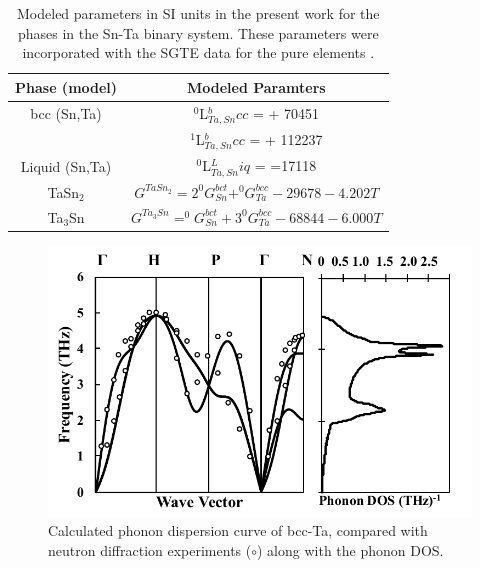 \newpage
\begin{table}[H]
 	\caption{Modeled parameters in SI units in the present work for the phases in the Sn-Ta binary system. These parameters were incorporated with the SGTE data for the pure elements \cite{Dinsdale1991}.}
 	\centering
 	\begin{tabular}{ c c }
 		\hline
 		Phase (model) & Modeled Paramters\\
 		\hline
 		bcc (Sn,Ta) & $^0$L$_{Ta,Sn}^bcc$ = + 70451\\
 		 & $^1$L$_{Ta,Sn}^bcc$ = + 112237\\
 		 Liquid (Sn,Ta) & $^0$L$_{Ta,Sn}^Liq$ = =17118\\
 		 TaSn$_2$ & $G^{TaSn_{2}} = 2^0G_{Sn}^{bct} + ^{0}G_{Ta}^{bcc} -29678 - 4.202T$ \\
 		 Ta$_3$Sn & $G^{Ta_{3}Sn} = ^0G_{Sn}^{bct} + 3^{0}G_{Ta}^{bcc} -68844 - 6.000T$ \\
 		\hline
 	\end{tabular}
 	\label{Ch4-table:ip}
 \end{table}
 \clearpage

\pagebreak
\begin{figure}[H]
	\centering
	\includegraphics[width=\textwidth]{Chapter-4/Figures/Taphonondos.pdf}
	\caption{Calculated phonon dispersion curve of bcc-Ta, compared with neutron diffraction experiments ($\circ$) \cite{Taioli2007a} along with the phonon DOS. }
	\label{Ch4-figure:Taphonon}
\end{figure}

